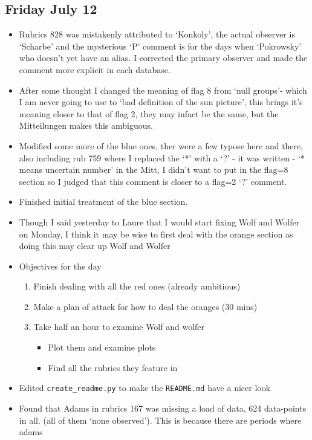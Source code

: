 \documentclass[12pt]{article}
\begin{document}
\subsection{Friday July 12}
\begin{itemize}
    \item Rubrics 828 was mistakenly attributed to `Konkoly', the actual observer is `Scharbe' and the mysterious `P' comment is for the days when `Pokrowsky' who doesn't yet have an alias. I corrected the primary observer and made the comment more explicit in each database.
    \item After some thought I changed the meaning of flag 8 from `null groups'- which I am never going to use to `bad definition of the sun picture', this brings it's meaning closer to that of flag 2, they may infact be the same, but the Mitteilungen makes this ambiguous.
    \item Modified some more of the blue ones, ther were a few typose here and there, also including rub 759 where I replaced the `*' with a `?' - it was written - `* means uncertain number' in the Mitt, I didn't want to put in the flag=8 section so I judged that this comment is closer to a flag=2 `?' comment.
    \item Finished initial treatment of the blue section.
    \item Though I said yesterday to Laure that I would start fixing Wolf and Wolfer on Monday, I think it may be wise to first deal with the orange section as doing this may clear up Wolf and Wolfer 
    \item Objectives for the day
    \begin{enumerate}
        \item Finish dealing with all the red ones (already ambitious)
        \item Make a plan of attack for how to deal the oranges (30 mins)
        \item Take half an hour to examine Wolf and wolfer
        \begin{itemize}
            \item Plot them and examine plots
            \item Find all the rubrics they feature in
        \end{itemize}
    \end{enumerate}
    \item Edited \texttt{create\_readme.py} to make the \texttt{README.md} have a nicer look
    \item Found that Adams in rubrics 167 was missing a load of data, 624 data-points in all. (all of them `none observed'). This is because there are periods where adams 

\end{itemize}
\end{document}
